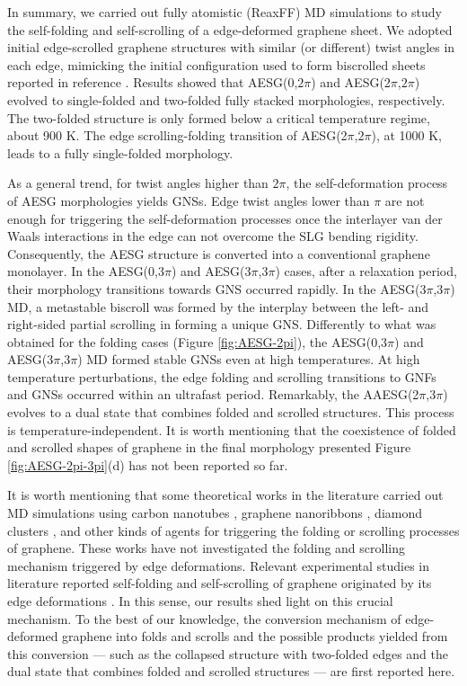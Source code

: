 \documentclass[twoside,twocolumn,9pt]{article}
\begin{document}
In summary, we carried out fully atomistic (ReaxFF) MD simulations to study the self-folding and self-scrolling of a edge-deformed graphene sheet. We adopted initial edge-scrolled graphene structures with similar (or different) twist angles in each edge, mimicking the initial configuration used to form biscrolled sheets reported in reference \cite{lima2011biscrolling}. Results showed that AESG(0,$2\pi$) and AESG(2$\pi$,$2\pi$) evolved to single-folded and two-folded fully stacked morphologies, respectively. The two-folded structure is only formed below a critical temperature regime, about 900 K. The edge scrolling-folding transition of AESG(2$\pi$,$2\pi$), at 1000 K, leads to a fully single-folded morphology. 

As a general trend, for twist angles higher than $2\pi$, the self-deformation process of AESG morphologies yields GNSs. Edge twist angles lower than $\pi$ are not enough for triggering the self-deformation processes once the interlayer van der Waals interactions in the edge can not overcome the SLG bending rigidity. Consequently, the AESG structure is converted into a conventional graphene monolayer. In the AESG(0,3$\pi$) and AESG(3$\pi$,3$\pi$) cases, after a relaxation period, their morphology transitions towards GNS occurred rapidly. In the AESG(3$\pi$,3$\pi$) MD, a metastable biscroll was formed by the interplay between the left- and right-sided partial scrolling in forming a unique GNS. Differently to what was obtained for the folding cases (Figure \ref{fig:AESG-2pi}), the AESG(0,3$\pi$) and AESG(3$\pi$,3$\pi$) MD formed stable GNSs even at high temperatures. At high temperature perturbations, the edge folding and scrolling transitions to GNFs and GNSs occurred within an ultrafast period. Remarkably, the AAESG(2$\pi$,3$\pi$) evolves to a dual state that combines folded and scrolled structures. This process is temperature-independent. It is worth mentioning that the coexistence of folded and scrolled shapes of graphene in the final morphology presented Figure \ref{fig:AESG-2pi-3pi}(d) has not been reported so far.  

It is worth mentioning that some theoretical works in the literature carried out MD simulations using carbon nanotubes \cite{zhang2011ultrafast,huang2015mechanical,zhang2010carbon,perim2013controlled}, graphene nanoribbons \cite{wang2015formation}, diamond clusters \cite{berman2015macroscale}, and other kinds of agents \cite{bejagam2018nanoparticle,xia2010fabrication} for triggering the folding or scrolling processes of graphene. These works have not investigated the folding and scrolling mechanism triggered by edge deformations. Relevant experimental studies in literature reported self-folding and self-scrolling of graphene originated by its edge deformations \cite{shinNANOSCALE_2014,meyerNATURE_2007}. In this sense, our results shed light on this crucial mechanism. To the best of our knowledge, the conversion mechanism of edge-deformed graphene into folds and scrolls and the possible products yielded from this conversion --- such as the collapsed structure with two-folded edges and the dual state that combines folded and scrolled structures --- are first reported here.
\end{document}
